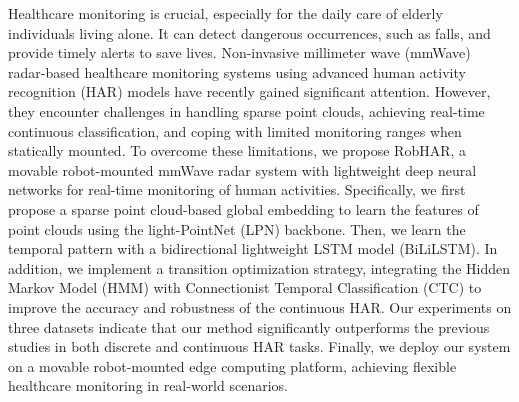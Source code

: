 Healthcare monitoring is crucial, especially for the daily care of elderly individuals living alone. It can detect dangerous occurrences, such as falls, and provide timely alerts to save lives. Non-invasive millimeter wave (mmWave) radar-based healthcare monitoring systems using advanced human activity recognition (HAR) models have recently gained significant attention. However, they encounter challenges in handling sparse point clouds, achieving real-time continuous classification, and coping with limited monitoring ranges when statically mounted.
To overcome these limitations, we propose RobHAR, a movable robot-mounted mmWave radar system with lightweight deep neural networks for real-time monitoring of human activities. Specifically, we first propose a sparse point cloud-based global embedding to learn the features of point clouds using the light-PointNet (LPN) backbone. Then, we learn the temporal pattern with a bidirectional lightweight LSTM model (BiLiLSTM). In addition, we implement a transition optimization strategy, integrating the Hidden Markov Model (HMM) with Connectionist Temporal Classification (CTC) to improve the accuracy and robustness of the continuous HAR. Our experiments on three datasets indicate that our method significantly outperforms the previous studies in both discrete and continuous HAR tasks. Finally, we deploy our system on a movable robot-mounted edge computing platform, achieving flexible healthcare monitoring in real-world scenarios.